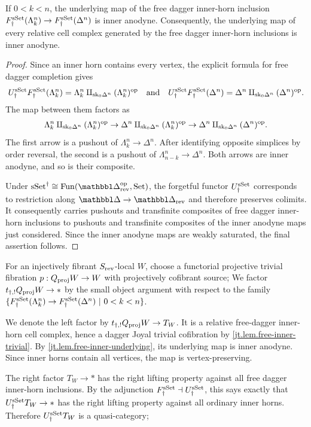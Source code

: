 \documentclass[a4paper,dvipdfmx,11pt]{amsart}
\begin{document}
\begin{lemma}\label{jt.lem.free-inner-underlying}
  If $0<k<n$, the underlying map of the free dagger inner-horn inclusion $F_{\dag}^{\mathrm{sSet}}(\Lambda^n_k) \to F_{\dag}^{\mathrm{sSet}}(\Delta^n)$ is inner anodyne.
  Consequently, the underlying map of every relative cell complex generated by the free dagger inner-horn inclusions is inner anodyne.
\end{lemma}

\begin{proof}
  Since an inner horn contains every vertex, the explicit formula for free dagger completion gives
  \begin{align}
    U_{\dag}^{\mathrm{sSet}}F_{\dag}^{\mathrm{sSet}}(\Lambda^n_k)
    =
    \Lambda^n_k\amalg_{\mathrm{sk}_0\Delta^n}(\Lambda^n_k)^{\operatorname{op}}
    \quad \text{and} \quad
    U_{\dag}^{\mathrm{sSet}}F_{\dag}^{\mathrm{sSet}}(\Delta^n)
    =
    \Delta^n\amalg_{\mathrm{sk}_0\Delta^n}(\Delta^n)^{\operatorname{op}}.
  \end{align}
  The map between them factors as
  \begin{align}
    \Lambda^n_k\amalg_{\mathrm{sk}_0\Delta^n}(\Lambda^n_k)^{\operatorname{op}}
    \to 
    \Delta^n\amalg_{\mathrm{sk}_0\Delta^n}(\Lambda^n_k)^{\operatorname{op}}
    \to 
    \Delta^n\amalg_{\mathrm{sk}_0\Delta^n}(\Delta^n)^{\operatorname{op}}.
  \end{align}
  The first arrow is a pushout of $\Lambda^n_k\to\Delta^n$.
  After identifying opposite simplices by order reversal, the second is a pushout of
  $\Lambda^n_{n-k}\to\Delta^n$.
  Both arrows are inner anodyne, and so is their composite.

  Under $\sSet^{\dag} \cong \Fun(\prism_{\rev}^{\myop},\Set)$, the forgetful functor $U_{\dag}^{\mathrm{sSet}}$ corresponds to restriction along
  $\prism\to\prism_{\rev}$ and therefore preserves colimits.
  It consequently carries pushouts and transfinite composites of free dagger inner-horn inclusions to pushouts and transfinite composites of the inner anodyne maps just considered.
  Since the inner anodyne maps are weakly saturated, the final assertion follows.
\end{proof}

\begin{remark}
  For an injectively fibrant $S_{\mathrm{rev}}$-local $W$, choose a functorial projective trivial fibration $p:Q_{\mathrm{proj}}W\to W$ with projectively cofibrant source;
  We factor $t_{\dag,!}Q_{\mathrm{proj}}W\to *$ by the small object argument with respect to the family $\{F_{\dag}^{\mathrm{sSet}}(\Lambda^n_k) \to F_{\dag}^{\mathrm{sSet}}(\Delta^n) ~|~ 0<k<n\}$.
  
  We denote the left factor by $t_{\dag,!}Q_{\mathrm{proj}}W \to T_W$.
  It is a relative free-dagger inner-horn cell complex, hence a dagger Joyal trivial cofibration by \cref{jt.lem.free-inner-trivial}.
  By \cref{jt.lem.free-inner-underlying}, its underlying map is inner anodyne.
  Since inner horns contain all vertices, the map is vertex-preserving.

  The right factor $T_W\to *$ has the right lifting property against all free dagger inner-horn inclusions.
  By the adjunction $F_{\dag}^{\mathrm{sSet}}\dashv U_{\dag}^{\mathrm{sSet}}$, this says exactly that
  $U_{\dag}^{\mathrm{sSet}} T_W\to *$ has the right lifting property against all ordinary inner horns.
  Therefore $U_{\dag}^{\mathrm{sSet}} T_W$ is a quasi-category;
\end{remark}
\end{document}
